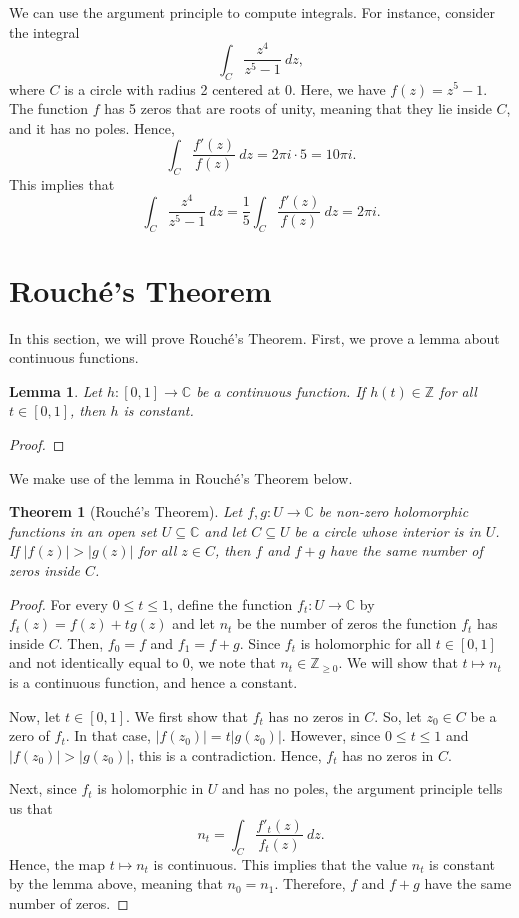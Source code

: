 \documentclass[a4paper, openany]{memoir}
\theoremstyle{definition}
\theoremstyle{plain}
\newtheorem{theorem}[definition]{Theorem}
\newtheorem{lemma}[definition]{Lemma}
\begin{document}
    \noindent We can use the argument principle to compute integrals. For instance, consider the integral
    \[\int_C \frac{z^4}{z^5 - 1} \ dz,\]
    where $C$ is a circle with radius 2 centered at 0. Here, we have $f(z) = z^5 - 1$. The function $f$ has 5 zeros that are roots of unity, meaning that they lie inside $C$, and it has no poles. Hence,
    \[\int_C \frac{f'(z)}{f(z)} \ dz = 2\pi i \cdot 5 = 10\pi i.\]
    This implies that
    \[\int_C \frac{z^4}{z^5 - 1} \ dz = \frac{1}{5} \int_C \frac{f'(z)}{f(z)} \ dz = 2\pi i.\]
    \newpage

    \section{Rouché's Theorem}
    In this section, we will prove Rouché's Theorem. First, we prove a lemma about continuous functions.
    \begin{lemma}
        Let $h \colon [0, 1] \to \mathbb{C}$ be a continuous function. If $h(t) \in \mathbb{Z}$ for all $t \in [0, 1]$, then $h$ is constant.
    \end{lemma}
    \begin{proof}
    \end{proof}
    \noindent We make use of the lemma in Rouché's Theorem below.
    \begin{theorem}[Rouché's Theorem]
        Let $f, g \colon U \to \mathbb{C}$ be non-zero holomorphic functions in an open set $U \subseteq \mathbb{C}$ and let $C \subseteq U$ be a circle whose interior is in $U$. If $|f(z)| > |g(z)|$ for all $z \in C$, then $f$ and $f + g$ have the same number of zeros inside $C$.
    \end{theorem}
    \begin{proof}
        For every $0 \leq t \leq 1$, define the function $f_t \colon U \to \mathbb{C}$ by $f_t(z) = f(z) + tg(z)$ and let $n_t$ be the number of zeros the function $f_t$ has inside $C$. Then, $f_0 = f$ and $f_1 = f + g$. Since $f_t$ is holomorphic for all $t \in [0, 1]$ and not identically equal to $0$, we note that $n_t \in \mathbb{Z}_{\geq 0}$. We will show that $t \mapsto n_t$ is a continuous function, and hence a constant.

        Now, let $t \in [0, 1]$. We first show that $f_t$ has no zeros in $C$. So, let $z_0 \in C$ be a zero of $f_t$. In that case, $|f(z_0)| = t|g(z_0)|$. However, since $0 \leq t \leq 1$ and $|f(z_0)| > |g(z_0)|$, this is a contradiction. Hence, $f_t$ has no zeros in $C$.

        Next, since $f_t$ is holomorphic in $U$ and has no poles, the argument principle tells us that
        \[n_t = \int_C \frac{f'_t(z)}{f_t(z)} \ dz.\]
        Hence, the map $t \mapsto n_t$ is continuous. This implies that the value $n_t$ is constant by the lemma above, meaning that $n_0 = n_1$. Therefore, $f$ and $f + g$ have the same number of zeros.
    \end{proof}
    
\end{document}
